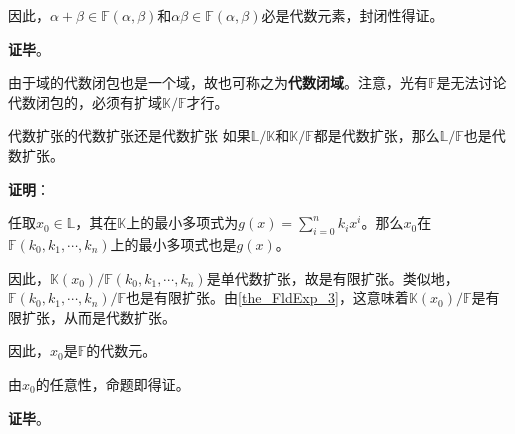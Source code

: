 因此，$\alpha+\beta\in\mathbb{F}(\alpha, \beta)$和$\alpha\beta\in\mathbb{F}(\alpha, \beta)$必是代数元素，封闭性得证。

\textbf{证毕}。


由于域的代数闭包也是一个域，故也可称之为\textbf{代数闭域}。注意，光有$\mathbb{F}$是无法讨论代数闭包的，必须有扩域$\mathbb{K}/\mathbb{F}$才行。


\begin{corollary}{代数扩张的代数扩张还是代数扩张}\label{cor_FldExp_2}
如果$\mathbb{L}/\mathbb{K}$和$\mathbb{K}/\mathbb{F}$都是代数扩张，那么$\mathbb{L}/\mathbb{F}$也是代数扩张。
\end{corollary}

\textbf{证明}：

任取$x_0\in\mathbb{L}$，其在$\mathbb{K}$上的最小多项式为$g(x) = \sum_{i=0}^n k_ix^i$。那么$x_0$在$\mathbb{F}(k_0, k_1, \cdots, k_n)$上的最小多项式也是$g(x)$。

因此，$\mathbb{K}(x_0)/\mathbb{F}(k_0, k_1, \cdots, k_n)$是单代数扩张，故是有限扩张。类似地，$\mathbb{F}(k_0, k_1, \cdots, k_n)/\mathbb{F}$也是有限扩张。由\autoref{the_FldExp_3}，这意味着$\mathbb{K}(x_0)/\mathbb{F}$是有限扩张，从而是代数扩张。

因此，$x_0$是$\mathbb{F}$的代数元。

由$x_0$的任意性，命题即得证。

\textbf{证毕}。





